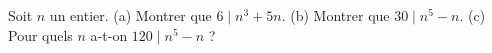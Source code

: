 Soit $n$ un entier. (a) Montrer que $6 \mid n^3 + 5n$. (b) Montrer que $30 \mid n^5 - n$. (c) Pour quels $n$ a-t-on $120 \mid n^5 - n$ ?
